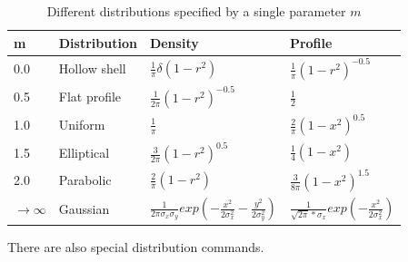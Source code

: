 \begin{table}[h!]
  \begin{center} \footnotesize
    \caption{Different distributions specified by a single parameter $m$}
    \label{tab:binomdist}
    \begin{tabular}{|l|l|l|l|}
      \hline
      \bf m & \bf Distribution & \bf Density & \bf Profile \\
      \hline
      0.0 & Hollow shell  & $\frac{1}{\pi}\delta(1-r^2)$ &$\frac{1}{\pi}(1-r^2)^{-0.5}$\\
      \hline
      0.5 & Flat profile  & $\frac{1}{2\pi}(1-r^2)^{-0.5}$ & $\frac{1}{2}$\\
      \hline
      1.0 & Uniform  & $\frac{1}{\pi}$ & $\frac{2}{\pi}(1-x^2)^{0.5}$\\
      \hline
      1.5 & Elliptical  & $\frac{3}{2\pi}(1-r^2)^{0.5}$ & $\frac{1}{4}(1-x^2)$ \\
      \hline
      2.0 & Parabolic  & $\frac{2}{\pi}(1-r^2)$ & $\frac{3}{8\pi}(1-x^2)^{1.5}$ \\
      \hline
      $\rightarrow \infty$ & Gaussian  & $\frac{1}{2\pi\sigma_x\sigma_y}exp(-\frac{x^2}{2\sigma_x^2} -\frac{y^2}{2\sigma_y^2})$ & 
      $\frac{1}{\sqrt{2\pi}*\sigma_x}exp(-\frac{x^2}{2\sigma_x^2}) $ \\
      \hline
    \end{tabular}
  \end{center} 
\end{table}
There are also special distribution commands.
